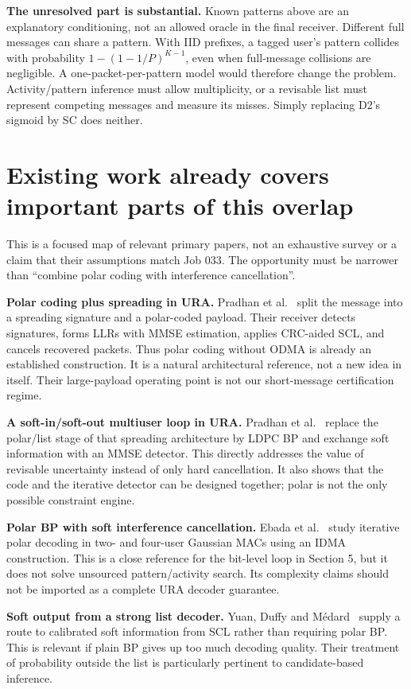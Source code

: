 \documentclass[10pt,a4paper]{article}
\begin{document}
\textbf{The unresolved part is substantial.} Known patterns above are an explanatory conditioning, not an allowed
oracle in the final receiver. Different full messages can share a pattern. With IID prefixes, a tagged user's pattern
collides with probability $1-(1-1/P)^{K-1}$, even when full-message collisions are negligible. A one-packet-per-pattern
model would therefore change the problem. Activity/pattern inference must allow multiplicity, or a revisable list must
represent competing messages and measure its misses. Simply replacing D2's sigmoid by SC does neither.

\clearpage
\section{Existing work already covers important parts of this overlap}
This is a focused map of relevant primary papers, not an exhaustive survey or a claim that their assumptions match
Job 033. The opportunity must be narrower than ``combine polar coding with interference cancellation''.

\textbf{Polar coding plus spreading in URA.} Pradhan et al.~\cite{spreading} split the message into a spreading
signature and a polar-coded payload. Their receiver detects signatures, forms LLRs with MMSE estimation, applies
CRC-aided SCL, and cancels recovered packets. Thus polar coding without ODMA is already an established construction.
It is a natural architectural reference, not a new idea in itself. Their large-payload operating point is not our
short-message certification regime.

\textbf{A soft-in/soft-out multiuser loop in URA.} Pradhan et al.~\cite{ldpc} replace the polar/list stage of that
spreading architecture by LDPC BP and exchange soft information with an MMSE detector. This directly addresses
the value of revisable uncertainty instead of only hard cancellation. It also shows that the code and the iterative
detector can be designed together; polar is not the only possible constraint engine.

\textbf{Polar BP with soft interference cancellation.} Ebada et al.~\cite{polarsoic} study iterative polar decoding
in two- and four-user Gaussian MACs using an IDMA construction. This is a close reference for the bit-level loop in
Section 5, but it does not solve unsourced pattern/activity search. Its complexity claims should not be imported
as a complete URA decoder guarantee.

\textbf{Soft output from a strong list decoder.} Yuan, Duffy and M\'edard~\cite{softscl} supply a route to calibrated
soft information from SCL rather than requiring polar BP. This is relevant if plain BP gives up too much decoding
quality. Their treatment of probability outside the list is particularly pertinent to candidate-based inference.
\end{document}
